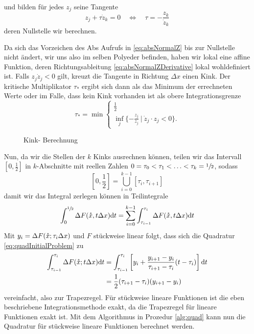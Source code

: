 und bilden für jedes $z_j$ seine Tangente
\[
 z_j + \tau \dot z_k = 0 \quad \iff \quad \tau =- \frac{z_k}{\dot z_k}
\]
deren Nullstelle wir berechnen.

Da sich das Vorzeichen des Abs Aufrufs in \eqref{eq:absNormalZ} bis zur Nullstelle nicht ändert, wir uns also im selben Polyeder befinden, haben wir lokal eine affine Funktion, deren Richtungsableitung \eqref{eq:absNormalZDerivative} lokal wohldefiniert ist.
Falls $z_j\dot z_j <0$ gilt, kreuzt die Tangente in Richtung $\Delta x$ einen Kink.
Der kritische Multiplikator $\tau_*$ ergibt sich dann als das Minimum der errechneten Werte oder im Falle, dass kein Kink vorhanden ist als obere Integrationsgrenze
\[
 \tau_* = \min \begin{cases}
		\frac{1}{2}\\
		\inf_j\lbrace -\frac{z_j}{\dot z_j}~ \vert ~ \dot z_j \cdot z_j <0 \rbrace.
	       \end{cases}
\]
\begin{figure}[ht]
\centering
 
 \caption{Kink- Berechnung}
\label{fig:findingKinks} 
\end{figure}
Nun, da wir die Stellen der $k$ Kinks ausrechnen können, teilen wir das Intervall $[0,\frac{1}{2}]$ in $k$-Abschnitte mit reellen Zahlen $0=\tau_0<\tau_1<\ldots<\tau_k = \sfrac{1}{2}$,  sodass
\[
 [0,\frac{1}{2}] = \bigcup_{i=0}^{k-1} [\tau_i,\tau_{i+1}]
\]
damit wir das Integral zerlegen können in Teilintegrale
\[
 \int_0^{\sfrac{1}{2}} \Delta F(\mathring{x},t\Delta x) \text{d}t = \sum_{i=0}^{k-1} \int_{\tau_{i-1}}^{\tau_{i}} \Delta F(\mathring{x},t\Delta x) \text{d}t
\]
Mit $y_i = \Delta F(\mathring{x};\tau_i \Delta x)$ und $F$ stückweise linear folgt, dass sich die Quadratur \eqref{eq:quadInitialProblem} zu
\begin{equation}
\begin{aligned}
 \int_{\tau_{i-1}}^{\tau_i} \Delta F(\mathring{x};t\Delta x) \text{d}t &= \int_{\tau_{i-1}}^{\tau_i}\left[ y_i+ \frac{y_{i+1}-y_i}{\tau_{i+1}-\tau_i}(t-\tau_i) \right] \text{d}t \\
 &=\frac{1}{2}(\tau_{i+1} -\tau_i)(y_{i+1}-y_i)
 \end{aligned}
\end{equation}
vereinfacht, also zur Trapezregel. Für stückweise lineare Funktionen ist die eben beschriebene Integrationsmethode exakt, da die Trapezregel für lineare Funktionen exakt ist.
Mit dem Algorithmus in Prozedur \ref{alg:quad} kann nun die Quadratur für stückweise lineare Funktionen berechnet werden. 
\vfill
